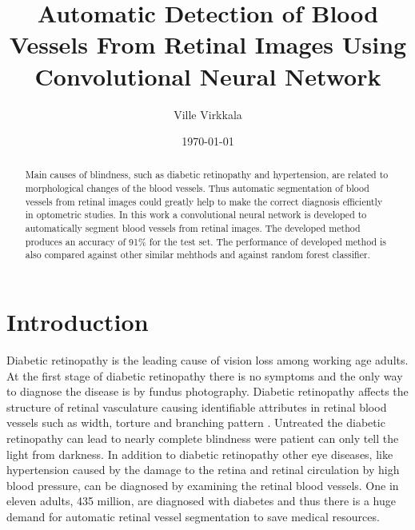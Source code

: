 \documentclass[aps,prb,10pt,twocolumn,groupedaddress]{revtex4-1}
\begin{document}
\title{Automatic Detection of Blood Vessels From Retinal Images Using Convolutional Neural Network }
\date{\today}
\author{Ville Virkkala}

\begin{abstract}
Main causes of blindness, such as diabetic retinopathy and hypertension, are related	to morphological changes of the blood vessels. Thus automatic segmentation of blood vessels from retinal images could greatly help to make the correct diagnosis efficiently in optometric studies. In this work a convolutional neural network is developed to automatically segment blood vessels from retinal images. The developed method produces an accuracy of 91\% for the test set. The performance of developed method is also compared against other similar mehthods and against random forest classifier. 
\end{abstract}

\maketitle

\section{Introduction}
Diabetic retinopathy is the leading cause of vision loss among working age adults. At the first stage of diabetic retinopathy there is no symptoms and the only way to diagnose the disease is by fundus photography. Diabetic retinopathy affects the structure of retinal vasculature causing identifiable attributes in retinal blood vessels such as width, torture and branching pattern \cite{zhu}. Untreated the diabetic retinopathy can lead to nearly complete blindness were patient can only tell the light from darkness. In addition to diabetic retinopathy other eye diseases, like hypertension caused by the damage to the retina and retinal circulation by high blood pressure, can be diagnosed by examining the retinal blood vessels. One in eleven adults, 435 million, are diagnosed with diabetes \cite{diabetic-federation} and thus there is a huge demand for automatic retinal vessel segmentation to save medical resources. 
\end{document}
